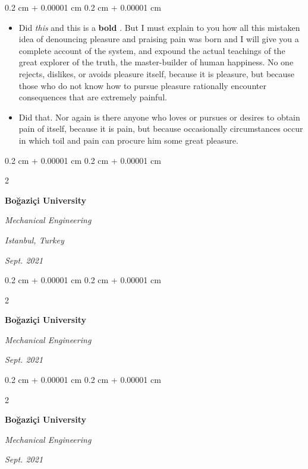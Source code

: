 \documentclass[10pt, letterpaper]{article}
\newenvironment{highlights}{
    \begin{itemize}[
        topsep=0.10 cm,
        parsep=0.10 cm,
        partopsep=0pt,
        itemsep=0pt,
        leftmargin=0.4 cm + 10pt
    ]
}{
    \end{itemize}
} %
\newenvironment{onecolentry}{
    \begin{adjustwidth}{
        0.2 cm + 0.00001 cm
    }{
        0.2 cm + 0.00001 cm
    }
}{
    \end{adjustwidth}
} %
\newenvironment{twocolentry}[2][]{
    \onecolentry
    \def\secondColumn{#2}
    \setcolumnwidth{\fill, 4.5 cm}
    \begin{paracol}{2}
}{
    \switchcolumn \raggedleft \secondColumn
    \end{paracol}
    \endonecolentry
} %
\let\hrefWithoutArrow\href
\renewcommand{\href}[2]{\hrefWithoutArrow{#1}{\mbox{\ifthenelse{\equal{#2}{}}{ }{#2 }\raisebox{.15ex}{\footnotesize \faExternalLink*}}}}
\begin{document}
        \vspace{0.10 cm-3px}
        \begin{onecolentry}
            \begin{highlights}
                \item Did \textit{this} and this is a \textbf{bold} \href{https://example.com}{link}. But I must explain to you how all this mistaken idea of denouncing pleasure and praising pain was born and I will give you a complete account of the system, and expound the actual teachings of the great explorer of the truth, the master-builder of human happiness. No one rejects, dislikes, or avoids pleasure itself, because it is pleasure, but because those who do not know how to pursue pleasure rationally encounter consequences that are extremely painful.
                \item Did that. Nor again is there anyone who loves or pursues or desires to obtain pain of itself, because it is pain, but because occasionally circumstances occur in which toil and pain can procure him some great pleasure.
            \end{highlights}
        \end{onecolentry}


        \vspace{0.2 cm-3px}

        \begin{twocolentry}{
        \textit{Istanbul, Turkey}    
            
        \textit{Sept. 2021}}
            \textbf{Boğaziçi University}

            \textit{Mechanical Engineering}
        \end{twocolentry}



        \vspace{0.2 cm-3px}

        \begin{twocolentry}{
            
            
        \textit{Sept. 2021}}
            \textbf{Boğaziçi University}

            \textit{Mechanical Engineering}
        \end{twocolentry}



        \vspace{0.2 cm-3px}

        \begin{twocolentry}{
            
            
        \textit{Sept. 2021}}
            \textbf{Boğaziçi University}

            \textit{Mechanical Engineering}
        \end{twocolentry}
\end{document}
